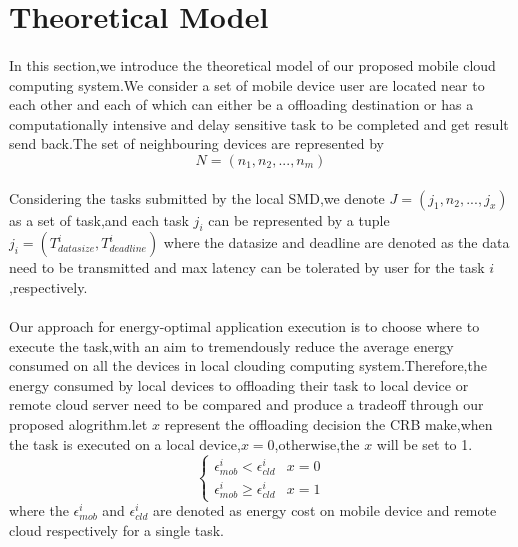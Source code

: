 \documentclass[review]{elsarticle}
\begin{document}
\section{Theoretical Model}
        \paragraph{}
        In this section,we introduce the theoretical model of our proposed mobile cloud computing system.We consider a set of mobile device user are located near to each other and each of which can either be a offloading destination or has a computationally intensive and delay sensitive task to be completed and get result send back.The set of neighbouring devices are represented by
        $$N=(n_{1},n_{2},...,n_{m})$$
        \paragraph{} Considering the tasks submitted by the local SMD,we denote $J=(j_{1},n_{2},...,j_{x})$ as a set of task,and each task $j_{i}$ can be represented by a tuple$j_{i}=(T_{datasize}^i,T_{deadline}^i) $ where the datasize and deadline are denoted as the data need to be transmitted and max latency can be tolerated by user for the task $i$,respectively.
         \paragraph{} Our approach for energy-optimal application execution is to choose where to execute the task,with an aim to tremendously reduce the average energy consumed on all the devices in local clouding computing system.Therefore,the energy consumed by local devices to offloading their task to local device or remote cloud server need to be compared and produce a tradeoff through our proposed alogrithm.let $x$ represent the offloading decision the CRB make,when the task is executed on a local device,$x=0$,otherwise,the $x$ will be set to 1.
               $$\begin{cases}
               {\epsilon_{mob}^i}<{\epsilon_{cld}^i} & x = 0\\
               {\epsilon_{mob}^i}\geq{\epsilon_{cld}^i} & x = 1\end
               {cases}$$
         where the $\epsilon_{mob}^i $ and  $\epsilon_{cld}^i $ are denoted as energy cost on mobile device and remote cloud respectively for a single task.
\end{document}
